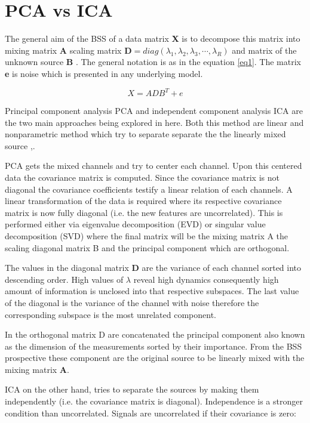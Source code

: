 \section{PCA vs ICA}

The general aim of the BSS of a data matrix \textbf{X} is to decompose this matrix into mixing matrix \textbf{A} scaling matrix \textbf{D}$=diag(\lambda_{1},\lambda_{2},\lambda_{3},\cdots,\lambda_{R})$ and matrix of the unknown source \textbf{B} \cite{3}. The general notation is as in the equation \ref{eq1}. The matrix \textbf{e} is noise which is presented in any underlying model.

\begin{equation}\label{eq1}
    X=ADB^{T}+e
\end{equation}

Principal component analysis PCA and independent component analysis ICA are the two main approaches being explored in here. Both this method are linear and nonparametric method which try to separate separate the the linearly mixed source  \cite{1},\cite{2}. 

PCA gets the mixed channels and try to center each channel. Upon this centered data the covariance matrix is computed. Since the covariance matrix is not diagonal the covariance coefficients testify a linear relation of each channels. A linear transformation of the data is required where its respective covariance matrix is now fully diagonal (i.e. the new features are uncorrelated). This is performed either via eigenvalue decomposition (EVD) or singular value decomposition (SVD) \cite{1} where the final matrix will be the mixing matrix A the scaling diagonal matrix B and the principal component which are orthogonal. 

The values in the diagonal matrix \textbf{D} are the variance of each channel sorted into descending order. High values of $\lambda$ reveal high dynamics consequently high amount of information is unclosed into that respective subspaces. The last value of the diagonal is the variance of the channel with noise therefore the corresponding subspace is the most unrelated component. 

In the orthogonal matrix D are concatenated the principal component also known as the dimension of the measurements sorted by their importance. From the BSS prospective these component are the original source to be linearly mixed with the mixing matrix \textbf{A}. 

ICA on the other hand, tries to separate the sources by making them independently (i.e. the covariance matrix is diagonal). Independence is a stronger condition than uncorrelated. Signals are uncorrelated if their covariance is zero:

